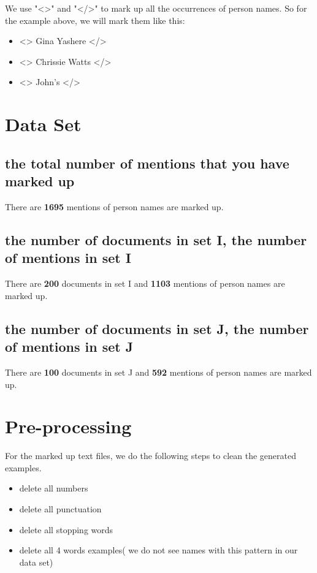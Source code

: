 \documentclass{article}
\begin{document}
We use "\textless\textgreater" and "\textless/\textgreater"  to mark up all the occurrences of person names. So for the example above, we will mark them like this:

\begin{itemize}
\setlength\itemsep{0.01em}
\item <> Gina Yashere </>
\item <> Chrissie Watts </>
\item <> John's </>
\end{itemize}

\section{Data Set}
\subsection{the total number of mentions that you have marked up}

There are \textbf{1695} mentions of person names are marked up.

\subsection{the number of documents in set I, the number of mentions in set I}

There are \textbf{200} documents in set I and \textbf{1103 }mentions of person names are marked up.


\subsection{the number of documents in set J, the number of mentions in set J}

There are \textbf{100} documents in set J and \textbf{592 }mentions of person names are marked up.

\section{Pre-processing}

For the marked up text files, we do the following steps to clean the generated examples.

\begin{itemize}
\setlength\itemsep{0.01em}
\item delete all numbers
\item delete all punctuation 
\item delete all stopping words
\item delete all 4 words examples( we do not see names with this pattern in our data set) 
\end{itemize}
\end{document}
